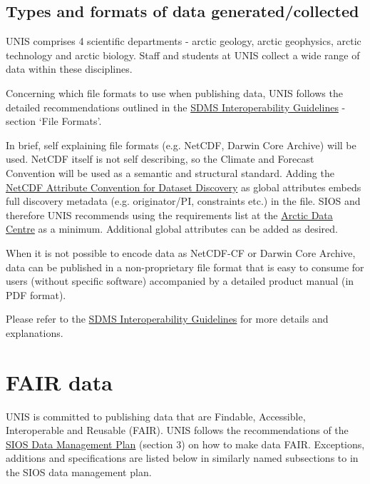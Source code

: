 \documentclass[a4paper,english, 11pt]{article}
\begin{document}
\subsection{Types and formats of data generated/collected}
\label{ss:datatypes}

UNIS comprises 4 scientific departments - arctic geology, arctic geophysics, arctic technology and arctic biology. Staff and students at UNIS collect a wide range of data within these disciplines.

Concerning which file formats to use when publishing data, UNIS follows the detailed recommendations outlined in the \href{https://sios-svalbard.org/sites/sios-svalbard.org/files/common/SDMS_Interoperability_Guidelines.pdf}{SDMS Interoperability Guidelines} - section `File Formats'.

In brief, self explaining file formats (e.g. NetCDF, Darwin Core Archive) will be used. NetCDF itself is not self describing, so the Climate and Forecast Convention will be used as a semantic and structural standard. Adding the \href{https://wiki.esipfed.org/Attribute_Convention_for_Data_Discovery_1-3}{NetCDF Attribute Convention for Dataset Discovery} as global attributes embeds full discovery
metadata (e.g. originator/PI, constraints etc.) in the file. SIOS and therefore UNIS recommends using the requirements list at the \href{https://adc.met.no/node/4}{Arctic Data Centre} as a minimum. Additional global attributes can be added as desired.

When it is not possible to encode data as NetCDF-CF or Darwin Core Archive, data can be published in a non-proprietary file format that is easy to consume for users (without specific software) accompanied by a detailed product manual (in PDF format).

Please refer to the \href{https://sios-svalbard.org/sites/sios-svalbard.org/files/common/SDMS_Interoperability_Guidelines.pdf}{SDMS Interoperability Guidelines} for more details and explanations.

\section{FAIR data}
\label{s:fair}

UNIS is committed to publishing data that are Findable, Accessible, Interoperable and Reusable (FAIR). UNIS follows the recommendations of the \href{https://sios-svalbard.org/sites/sios-svalbard.org/files/common/SIOS_Data_Management_Plan.pdf}{SIOS Data Management Plan} (section 3) on how to make data FAIR. Exceptions, additions and specifications are listed below in similarly named subsections to in the SIOS data management plan.
\end{document}
